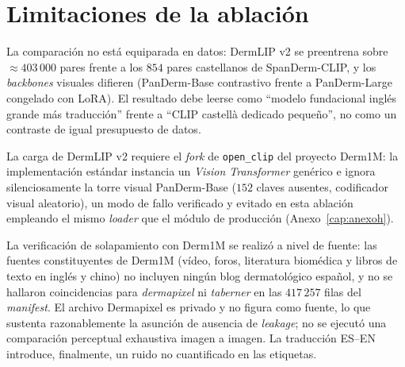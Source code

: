 \section{Limitaciones de la ablación}
\label{sec:anexoi-limitaciones}

La comparación no está equiparada en datos: DermLIP v2 se
preentrena sobre $\approx 403\,000$ pares frente a los $854$ pares
castellanos de SpanDerm-CLIP, y los \emph{backbones} visuales
difieren (PanDerm-Base contrastivo frente a PanDerm-Large
congelado con LoRA). El resultado debe leerse como ``modelo
fundacional inglés grande más traducción'' frente a ``CLIP
castellà dedicado pequeño'', no como un contraste de igual
presupuesto de datos.

La carga de DermLIP v2 requiere el \emph{fork} de
\texttt{open\_clip} del proyecto Derm1M: la implementación estándar
instancia un \emph{Vision Transformer} genérico e ignora
silenciosamente la torre visual PanDerm-Base ($152$ claves
ausentes, codificador visual aleatorio), un modo de fallo
verificado y evitado en esta ablación empleando el mismo
\emph{loader} que el módulo de producción
(Anexo~\ref{cap:anexoh}).

La verificación de solapamiento con Derm1M se realizó a nivel de
fuente: las fuentes constituyentes de Derm1M (vídeo, foros,
literatura biomédica y libros de texto en inglés y chino) no
incluyen ningún blog dermatológico español, y no se hallaron
coincidencias para \emph{dermapixel} ni \emph{taberner} en las
$417\,257$ filas del \emph{manifest}. El archivo Dermapixel es
privado y no figura como fuente, lo que sustenta razonablemente la
asunción de ausencia de \emph{leakage}; no se ejecutó una
comparación perceptual exhaustiva imagen a imagen. La traducción
ES--EN introduce, finalmente, un ruido no cuantificado en las
etiquetas.
